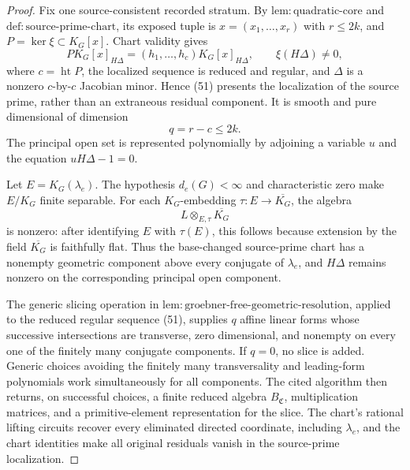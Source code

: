 \documentclass{article}
\begin{document}
\begin{proof}
Fix one source-consistent recorded stratum.  By \(\mathrm{lem:quadratic\mbox{-}core}\) and \(\mathrm{def:source\mbox{-}prime\mbox{-}chart}\), its exposed tuple is \(x=(x_1,\ldots,x_r)\) with \(r\leq2k\), and \(P=\ker\xi\subset K_G[x]\).  Chart validity gives
\[
 P K_G[x]_{H\Delta}
 =(h_1,\ldots,h_c)K_G[x]_{H\Delta},
 \qquad \xi(H\Delta)\ne0,
\tag{51}
\]
where \(c=\operatorname{ht}P\), the localized sequence is reduced and regular, and \(\Delta\) is a nonzero \(c\)-by-\(c\) Jacobian minor.  Hence (51) presents the localization of the source prime, rather than an extraneous residual component.  It is smooth and pure dimensional of dimension
\[
 q=r-c\leq2k.
\tag{52}
\]
The principal open set is represented polynomially by adjoining a variable \(u\) and the equation \(uH\Delta-1=0\).

Let \(E=K_G(\lambda_e)\).  The hypothesis \(d_e(G)<\infty\) and characteristic zero make \(E/K_G\) finite separable.  For each \(K_G\)-embedding \(\tau:E\to\overline{K_G}\), the algebra
\[
 L\otimes_{E,\tau}\overline{K_G}
\tag{53}
\]
is nonzero: after identifying \(E\) with \(\tau(E)\), this follows because extension by the field \(\overline{K_G}\) is faithfully flat.  Thus the base-changed source-prime chart has a nonempty geometric component above every conjugate of \(\lambda_e\), and \(H\Delta\) remains nonzero on the corresponding principal open component.

The generic slicing operation in \(\mathrm{lem:groebner\mbox{-}free\mbox{-}geometric\mbox{-}resolution}\), applied to the reduced regular sequence (51), supplies \(q\) affine linear forms whose successive intersections are transverse, zero dimensional, and nonempty on every one of the finitely many conjugate components.  If \(q=0\), no slice is added.  Generic choices avoiding the finitely many transversality and leading-form polynomials work simultaneously for all components.  The cited algorithm then returns, on successful choices, a finite reduced algebra \(B_{\mathfrak C}\), multiplication matrices, and a primitive-element representation for the slice.  The chart's rational lifting circuits recover every eliminated directed coordinate, including \(\lambda_e\), and the chart identities make all original residuals vanish in the source-prime localization.


\end{proof}
\end{document}
